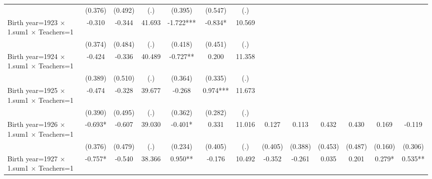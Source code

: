 {\begin{tabular}{l*{12}{c}}
                    &     (0.376)   &     (0.492)   &         (.)   &     (0.395)   &     (0.547)   &         (.)   &               &               &               &               &               &               \\
Birth year=1923 $\times$ 1.sum1 $\times$ Teachers=1&      -0.310   &      -0.344   &      41.693   &      -1.722***&      -0.834*  &      10.569   &               &               &               &               &               &               \\
                    &     (0.374)   &     (0.484)   &         (.)   &     (0.418)   &     (0.451)   &         (.)   &               &               &               &               &               &               \\
Birth year=1924 $\times$ 1.sum1 $\times$ Teachers=1&      -0.424   &      -0.336   &      40.489   &      -0.727** &       0.200   &      11.358   &               &               &               &               &               &               \\
                    &     (0.389)   &     (0.510)   &         (.)   &     (0.364)   &     (0.335)   &         (.)   &               &               &               &               &               &               \\
Birth year=1925 $\times$ 1.sum1 $\times$ Teachers=1&      -0.474   &      -0.328   &      39.677   &      -0.268   &       0.974***&      11.673   &               &               &               &               &               &               \\
                    &     (0.390)   &     (0.495)   &         (.)   &     (0.362)   &     (0.282)   &         (.)   &               &               &               &               &               &               \\
Birth year=1926 $\times$ 1.sum1 $\times$ Teachers=1&      -0.693*  &      -0.607   &      39.030   &      -0.401*  &       0.331   &      11.016   &       0.127   &       0.113   &       0.432   &       0.430   &       0.169   &      -0.119   \\
                    &     (0.376)   &     (0.479)   &         (.)   &     (0.234)   &     (0.405)   &         (.)   &     (0.405)   &     (0.388)   &     (0.453)   &     (0.487)   &     (0.160)   &     (0.306)   \\
Birth year=1927 $\times$ 1.sum1 $\times$ Teachers=1&      -0.757*  &      -0.540   &      38.366   &       0.950** &      -0.176   &      10.492   &      -0.352   &      -0.261   &       0.035   &       0.201   &       0.279*  &       0.535** \\

\end{tabular}}
